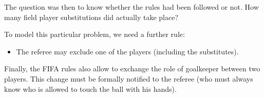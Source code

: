 \documentclass{article}
\begin{document}
The question was then to know whether the rules had been followed or not. How
many field player substitutions did actually take place?

To model this particular problem, we need a further rule:

\begin{itemize}
\item The referee may exclude one of the players (including the substitutes).
\end{itemize}

Finally, the FIFA rules also allow to exchange the role of goalkeeper between
two players. This change must be formally notified to the referee (who must
always know who is allowed to touch the ball with his hands).

\newpage

\end{document}
